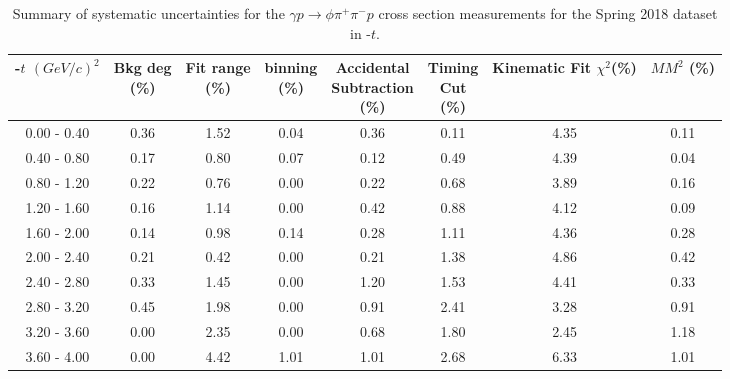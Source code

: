 \begin{table}[!htbp]
    \small
    \centering
    \caption{Summary of systematic uncertainties for the $\gamma p \rightarrow \phi \pi^{+} \pi^{-} p$ cross section measurements for the Spring 2018 dataset in -$t$.}
    \label{tab.syserr.phi2pi.3.2}
    \begin{tabular}{|c|c|c|c|c|c|c|c|}
        \hline
        -$t$ $(GeV/c)^{2}$&\thead{Bkg deg\\(\%)}&\thead{Fit range\\(\%)}&\thead{binning\\(\%)}&\thead{Accidental\\Subtraction\\(\%)}&\thead{Timing\\Cut\\(\%)}&\thead{Kinematic\\Fit $\chi^{2}$(\%)}&\thead{$MM^{2}$\\(\%)}\\
        \hline
        0.00 - 0.40 & 0.36 & 1.52 & 0.04 & 0.36 & 0.11 & 4.35 & 0.11 \\ 
        0.40 - 0.80 & 0.17 & 0.80 & 0.07 & 0.12 & 0.49 & 4.39 & 0.04 \\ 
        0.80 - 1.20 & 0.22 & 0.76 & 0.00 & 0.22 & 0.68 & 3.89 & 0.16 \\ 
        1.20 - 1.60 & 0.16 & 1.14 & 0.00 & 0.42 & 0.88 & 4.12 & 0.09 \\ 
        1.60 - 2.00 & 0.14 & 0.98 & 0.14 & 0.28 & 1.11 & 4.36 & 0.28 \\ 
        2.00 - 2.40 & 0.21 & 0.42 & 0.00 & 0.21 & 1.38 & 4.86 & 0.42 \\ 
        2.40 - 2.80 & 0.33 & 1.45 & 0.00 & 1.20 & 1.53 & 4.41 & 0.33 \\ 
        2.80 - 3.20 & 0.45 & 1.98 & 0.00 & 0.91 & 2.41 & 3.28 & 0.91 \\ 
        3.20 - 3.60 & 0.00 & 2.35 & 0.00 & 0.68 & 1.80 & 2.45 & 1.18 \\ 
        3.60 - 4.00 & 0.00 & 4.42 & 1.01 & 1.01 & 2.68 & 6.33 & 1.01 \\
        \hline
    \end{tabular}
\end{table}

